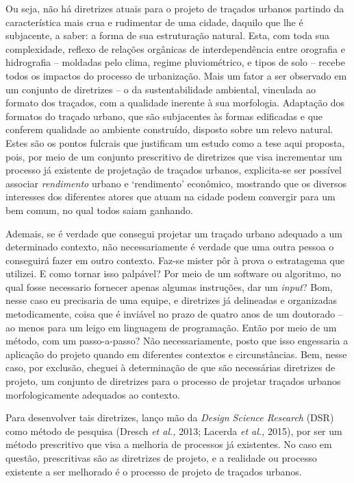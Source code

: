 \documentclass[12pt, a4paper]{book} %
\begin{document}
        Ou seja, não há diretrizes atuais para o projeto de traçados urbanos partindo da característica mais crua e rudimentar de uma cidade, daquilo que lhe é subjacente, a saber: a forma de sua estruturação natural. Esta, com toda sua complexidade, reflexo de relações orgânicas de interdependência entre orografia e hidrografia – moldadas pelo clima, regime pluviométrico, e tipos de solo – recebe todos os impactos do processo de urbanização. Mais um fator a ser observado em um conjunto de diretrizes – o da sustentabilidade ambiental, vinculada ao formato dos traçados, com a qualidade inerente à sua morfologia. Adaptação dos formatos do traçado urbano, que são subjacentes às formas edificadas e que conferem qualidade ao ambiente construído, disposto sobre um relevo natural. Estes são os pontos fulcrais que justificam um estudo como a tese aqui proposta, pois, por meio de um conjunto prescritivo de diretrizes que visa incrementar um processo já existente de projetação de traçados urbanos, explicita-se ser possível associar \textit{rendimento} urbano e `rendimento’ econômico, mostrando que os diversos interesses dos diferentes atores que atuam na cidade podem convergir para um bem comum, no qual todos saiam ganhando.

        Ademais, se é verdade que consegui projetar um traçado urbano adequado a um determinado contexto, não necessariamente é verdade que uma outra pessoa o conseguirá fazer em outro contexto. Faz-se mister pôr à prova o estratagema que utilizei. E como tornar isso palpável? Por meio de um software ou algoritmo, no qual fosse necessario fornecer apenas algumas instruções, dar um \textit{input}? Bom, nesse caso eu precisaria de uma equipe, e diretrizes já delineadas e organizadas metodicamente, coisa que é inviável no prazo de quatro anos de um doutorado – ao menos para um leigo em linguagem de programação. Então por meio de um método, com um passo-a-passo? Não necessariamente, posto que isso engessaria a aplicação do projeto quando em diferentes contextos e circunstâncias. Bem, nesse caso, por exclusão, cheguei à determinação de que são necessárias diretrizes de projeto, um conjunto de diretrizes para o processo de projetar traçados urbanos morfologicamente adequados ao contexto. 

        Para desenvolver tais diretrizes, lanço mão da \textit{Design Science Research} (DSR) como método de pesquisa (Dresch \textit{et al.,} 2013; Lacerda \textit{et al.,} 2015), por ser um método prescritivo que visa a melhoria de processos já existentes. No caso em questão, prescritivas são as diretrizes de projeto, e a realidade ou processo existente a ser melhorado é o processo de projeto de traçados urbanos.
\end{document}
